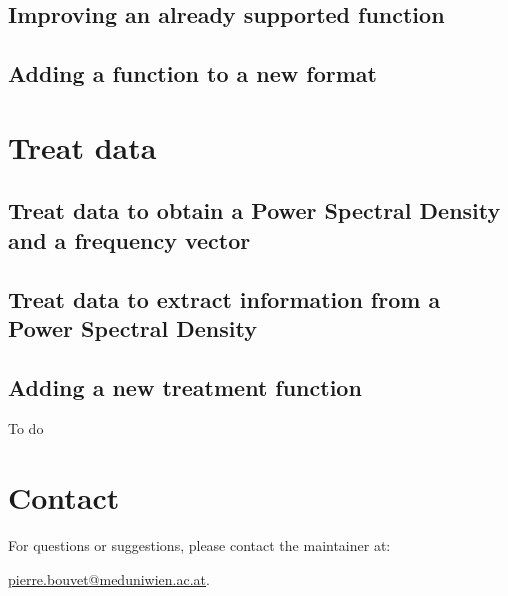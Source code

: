 \documentclass{book}
\begin{document}
        \section{Improving an already supported function} \label{subsec:load_data.improvement}
            

        \section{Adding a function to a new format} \label{subsec:load_data.new_format}
            
            

    \chapter{Treat data} \label{sec:treatment}
        

        \section{Treat data to obtain a Power Spectral Density and a frequency vector} \label{subsec:treatment.toPSD}
            

        \section{Treat data to extract information from a Power Spectral Density} \label{subsec:treatment.toInfo}
            

        \section{Adding a new treatment function} \label{subsec:treatment.new}
            \begin{tcolorbox}
                To do
            \end{tcolorbox}


    \chapter*{Contact}
        For questions or suggestions, please contact the maintainer at:
        \begin{center}
            \href{mailto:pierre.bouvet@meduniwien.ac.at}{pierre.bouvet@meduniwien.ac.at}.
        \end{center}
\end{document}
